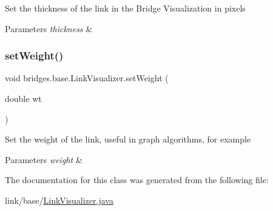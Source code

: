 Set the thickness of the link in the Bridge Visualization in pixels


\begin{DoxyParams}{Parameters}
{\em thickness} & \\
\hline
\end{DoxyParams}
\hypertarget{classbridges_1_1base_1_1_link_visualizer_a21d5884d243cf5a08f9d544f5083a44c}{}\label{classbridges_1_1base_1_1_link_visualizer_a21d5884d243cf5a08f9d544f5083a44c} 
\subsubsection{\texorpdfstring{set\+Weight()}{setWeight()}}
{\footnotesize\ttfamily void bridges.\+base.\+Link\+Visualizer.\+set\+Weight (\begin{DoxyParamCaption}\item[{double}]{wt }\end{DoxyParamCaption})}

Set the weight of the link, useful in graph algorithms, for example


\begin{DoxyParams}{Parameters}
{\em weight} & \\
\hline
\end{DoxyParams}


The documentation for this class was generated from the following file\+:\begin{DoxyCompactItemize}
\item 
link/base/\hyperlink{_link_visualizer_8java}{Link\+Visualizer.\+java}\end{DoxyCompactItemize}
